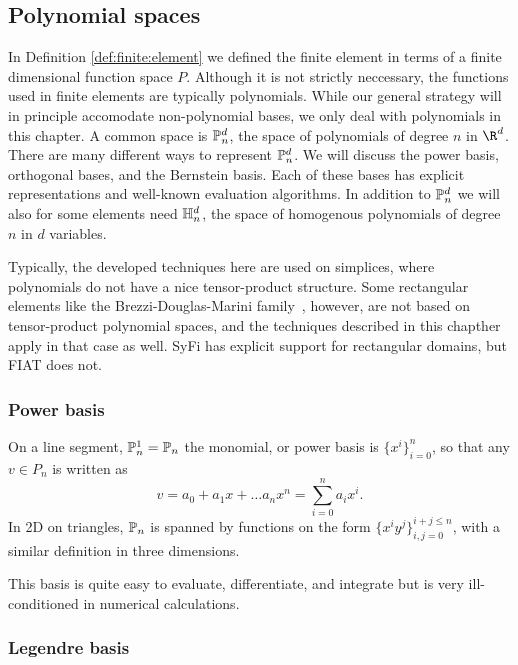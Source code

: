 \subsection{Polynomial spaces}
In Definition \ref{def:finite:element} we defined the finite element in terms
of a finite dimensional function space $P$. Although it is not strictly
neccessary,  
the functions used in finite elements are typically polynomials.
While our general strategy will in principle accomodate non-polynomial bases, we
only deal with polynomials in this chapter.
A common space is 
$\P_n^d$, the space of polynomials of degree $n$ in $\R^d$. There 
are many different ways to represent $\P^d_n$. We will discuss the power
basis, orthogonal bases, and the Bernstein basis.  Each of these bases
has explicit representations and well-known evaluation algorithms.
In addition to $\P^d_n$ we will also for some 
elements need $\H^d_n$, the space of homogenous polynomials of degree
\( n \) in \( d \) variables.  

Typically, the developed techniques here 
are used on simplices, where polynomials do not have a nice
tensor-product structure.  Some rectangular elements like the
Brezzi-Douglas-Marini family~\cite{}, however, are not based on
tensor-product polynomial spaces, and the techniques described 
in this chapther apply in that
case as well.  SyFi has explicit support for rectangular domains, but
FIAT does not. 

\subsubsection{Power basis}
On a line segment, $\P_n^1=\P_n$ the monomial, or power basis is 
\( \{ x^i \}_{i=0}^{n} \), so that any \( v \in P_n \) is written as
\begin{equation}
\label{pn1d}
v = a_0 + a_1 x + \ldots a_n x^n = \sum^n_{i=0} a_i x^i.
\end{equation}
In 2D on triangles, $\P_n$ is spanned by functions on the form
\( \{ x^i y^j \}_{i,j=0}^{i+j\leq n} \), with a similar definition in
three dimensions.

This basis is quite easy to evaluate, differentiate, and
integrate but is very ill-conditioned in numerical calculations.

\subsubsection{Legendre basis}

